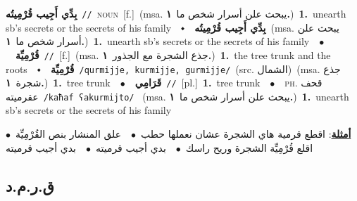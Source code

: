 \documentclass[10pt,a4paper,twoside]{article} %
\begin{document}
\begin{multicols}{2}
{\setlength\topsep{0pt}\textbf{\foreignlanguage{arabic}{بِدِّي أَجِيب قُرْمِيتُه}}\ {\color{gray}\texttt{//}\color{black}}\ \textsc{noun}\ [f.]\ \color{gray}(msa. \foreignlanguage{arabic}{يبحث علن أسرار شخص ما}~\foreignlanguage{arabic}{\textbf{١.}})\color{black}\ \textbf{1.}~unearth sb's secrets or the secrets of his family\ \ $\smblkdiamond$\ \ \setlength\topsep{0pt}\textbf{\foreignlanguage{arabic}{بِدِّي أَجِيب قُرْمِيتُه}}\ \color{gray}(msa. \foreignlanguage{arabic}{يبحث علن أسرار شخص ما}~\foreignlanguage{arabic}{\textbf{١.}})\color{black}\ \textbf{1.}~unearth sb's secrets or the secrets of his family\ \ $\bullet$\ \ \setlength\topsep{0pt}\textbf{\foreignlanguage{arabic}{قُرْمِيِّة}}\ {\color{gray}\texttt{//}\color{black}}\ [f.]\ \color{gray}(msa. \foreignlanguage{arabic}{جذع الشجرة مع الجذور}~\foreignlanguage{arabic}{\textbf{١.}})\color{black}\ \textbf{1.}~the tree trunk and the roots\ \ $\smblkdiamond$\ \ \setlength\topsep{0pt}\textbf{\foreignlanguage{arabic}{قُرْمِيِّة}}\ {\color{gray}\texttt{/qurmijje, kurmijje, ɡurmijje/}\color{black}}\ (src. \color{gray}\foreignlanguage{arabic}{الشمال}\color{black})\ \color{gray}(msa. \foreignlanguage{arabic}{جذع شجرة}~\foreignlanguage{arabic}{\textbf{١.}})\color{black}\ \textbf{1.}~tree trunk\ \ $\bullet$\ \ \setlength\topsep{0pt}\textbf{\foreignlanguage{arabic}{قَرَامِي}}\ {\color{gray}\texttt{//}\color{black}}\ [pl.]\ \textbf{1.}~tree trunk\ \ $\bullet$\ \ \textsc{ph.} \color{gray} \foreignlanguage{arabic}{قحف عقرميته}\color{black}\ {\color{gray}\texttt{/{\sffamily kaħaf ʕakurmijto}/}\color{black}}\ \color{gray} (msa. \foreignlanguage{arabic}{يبحث علن أسرار شخص ما}~\foreignlanguage{arabic}{\textbf{١.}})\color{black}\ \textbf{1.}~unearth sb's secrets or the secrets of his family\  \begin{flushright}\color{gray}\foreignlanguage{arabic}{\textbf{\underline{\foreignlanguage{arabic}{أمثلة}}}: اقطع قرمية هاي الشجرة عشان نعملها حطب\ $\bullet$\ \  علق المنشار  بنص القُرْمِيِّة\ $\bullet$\ \  اقلع قُرْمِيِّة الشجرة وريح راسك\ $\bullet$\ \  بدي أجيب قرميته\ $\bullet$\ \  بدي أجيب قرميته}\end{flushright}\color{black}} \vspace{2mm}

\vspace{-3mm}
\subsection*{\color{blue}\foreignlanguage{arabic}{ق.ر.م.د}\color{blue}{ (ntws)}} 


\end{multicols}
\end{document}
